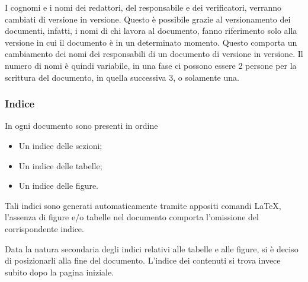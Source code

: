 \documentclass[a4paper]{article}
\begin{document}
		I cognomi e i nomi dei redattori, del responsabile e dei verificatori, verranno cambiati di versione in versione. Questo è possibile 
		grazie al versionamento dei documenti, infatti, i nomi di chi lavora al documento, fanno riferimento solo alla versione in cui il documento 
		è in un determinato momento. Questo comporta un cambiamento dei nomi dei responsabili di un documento di versione in versione. Il numero di nomi 
		è quindi variabile, in una fase ci possono essere 2 persone per la scrittura del documento, in quella successiva 3, o solamente una.
		
		\subsubsection{Indice}
			In ogni documento sono presenti in ordine
			\begin{itemize}
				\item Un indice delle sezioni;
				\item Un indice delle tabelle;
				\item Un indice delle figure.
			\end{itemize}
			Tali indici sono generati automaticamente tramite appositi comandi \LaTeX, l'assenza di figure
			e/o tabelle nel documento comporta l'omissione del corrispondente indice.

		Data la natura secondaria degli indici relativi alle tabelle e alle figure, si è deciso di posizionarli alla fine del documento.
		L'indice dei contenuti si trova invece subito dopo la pagina iniziale.
\end{document}
